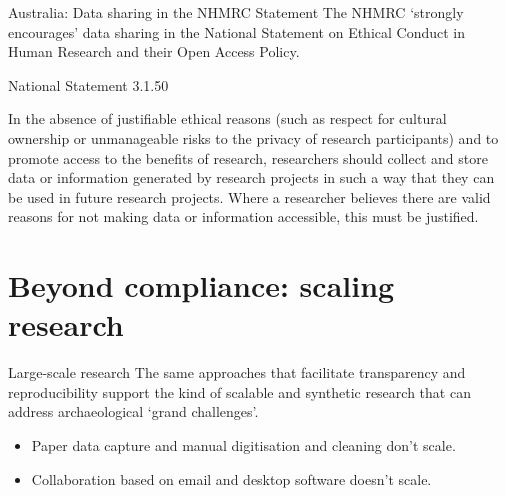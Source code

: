 \documentclass[aspectratio=169, 11pt]{beamer} %
\begin{document}
\begin{frame}{Australia: Data sharing in the NHMRC Statement}
    The NHMRC `strongly encourages' data sharing in the National Statement on Ethical Conduct in Human Research and their Open Access Policy. \cite{Nhmrc2018-sj, Nhmrc2018-vn} \par
    National Statement 3.1.50 \par
    In the absence of justifiable ethical reasons (such as respect for cultural ownership or unmanageable risks to the privacy of research participants) and to promote access to the benefits of research, researchers should collect and store data or information generated by research projects in such a way that they can be used in future research projects. Where a researcher believes there are valid reasons for not making data or information accessible, this must be justified.
\end{frame}

\section{Beyond compliance: scaling research}

\begin{frame}{Large-scale research}
    The same approaches that facilitate transparency and reproducibility support the kind of scalable and synthetic research that can address archaeological `grand challenges'. \cite{Kintigh2014-ub}
        \begin{itemize}[label=\textbullet]
            \item Paper data capture and manual digitisation and cleaning don't scale.
            \item Collaboration based on email and desktop software doesn't scale.
    \end{itemize}
    
\end{frame}
\end{document}
